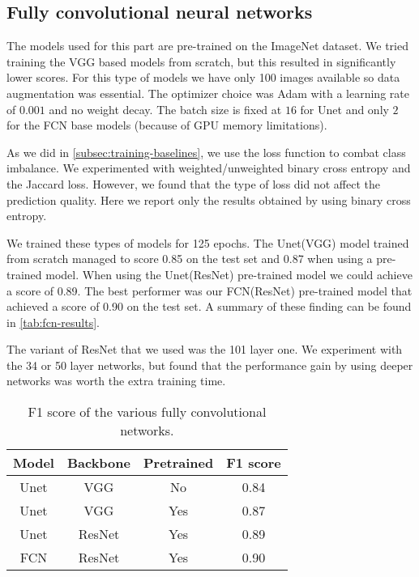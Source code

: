 \subsection{Fully convolutional neural networks} \label{subsec:training-fcn}
The models used for this part are pre-trained on the ImageNet dataset. We tried training the VGG based models from scratch, but this resulted in significantly lower scores. For this type of models we have only 100 images available so data augmentation was essential. The optimizer choice was Adam with a learning rate of $0.001$ and no weight decay. The batch size is fixed at $16$ for Unet and only $2$ for the FCN base models (because of GPU memory limitations).

As we did in \autoref{subsec:training-baselines}, we use the loss function to combat class imbalance. We experimented with weighted/unweighted binary cross entropy and the Jaccard loss. However, we found that the type of loss did not affect the prediction quality. Here we report only the results obtained by using binary cross entropy.

We trained these types of models for 125 epochs. The Unet(VGG) model trained from scratch managed to score 0.85 on the test set and 0.87 when using a pre-trained model. When using the Unet(ResNet) pre-trained model we could achieve a score of 0.89. The best performer was our FCN(ResNet) pre-trained model that achieved a score of 0.90 on the test set. A summary of these finding can be found in \autoref{tab:fcn-results}.

The variant of ResNet that we used was the 101 layer one. We experiment with the 34 or 50 layer networks, but found that the performance gain by using deeper networks was worth the extra training time.

\begin{table}[h]
    \centering
    \begin{tabular}{|c|c|c|c|}
        \hline
        \textbf{Model} & \textbf{Backbone} & \textbf{Pretrained} & \textbf{F1 score} \\
        \hline
        \hline
        Unet & VGG & No & 0.84 \\
        \hline
        Unet & VGG & Yes & 0.87 \\
        \hline
        Unet & ResNet & Yes & 0.89 \\
        \hline
        FCN & ResNet & Yes & 0.90 \\
        \hline
    \end{tabular}
    \caption{F1 score of the various fully convolutional networks.}
    \label{tab:fcn-results}
\end{table}


